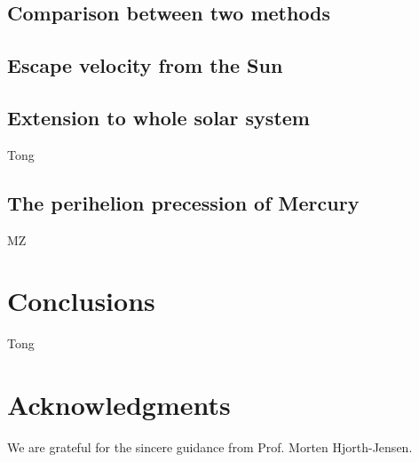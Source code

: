 \documentclass{article}
\begin{document}
	\subsection{Comparison between two methods}
	

	\subsection{Escape velocity from the Sun}
	
	
	\subsection{Extension to whole solar system}
	Tong
	
	\subsection{The perihelion precession of Mercury}
	MZ
	
\section{Conclusions}\label{conclude}
Tong
	
	\section*{Acknowledgments}
	We are grateful for the sincere guidance from Prof. Morten Hjorth-Jensen. 
	
	\nocite{*} 
	
	
\end{document}
